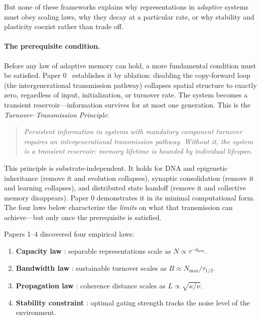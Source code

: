 \documentclass[11pt]{article}
\begin{document}
But none of these frameworks explains why representations in \emph{adaptive} systems must obey scaling laws, why they decay at a particular rate, or why stability and plasticity coexist rather than trade off.

\paragraph{The prerequisite condition.}
Before any law of adaptive memory can hold, a more fundamental condition must be satisfied. Paper 0~\cite{aubin2026p0} establishes it by ablation: disabling the copy-forward loop (the intergenerational transmission pathway) collapses spatial structure to exactly zero, regardless of input, initialization, or turnover rate. The system becomes a transient reservoir---information survives for at most one generation. This is the \emph{Turnover--Transmission Principle}:

\begin{quote}
\textit{Persistent information in systems with mandatory component turnover requires an intergenerational transmission pathway. Without it, the system is a transient reservoir: memory lifetime is bounded by individual lifespan.}
\end{quote}

This principle is substrate-independent. It holds for DNA and epigenetic inheritance (remove it and evolution collapses), synaptic consolidation (remove it and learning collapses), and distributed state handoff (remove it and collective memory disappears). Paper 0 demonstrates it in its minimal computational form. The four laws below characterize the \emph{limits} on what that transmission can achieve---but only once the prerequisite is satisfied.

Papers 1--4 \cite{aubin2026capacity,aubin2026bandwidth,aubin2026propagation,aubin2026stability} discovered four empirical laws:
\begin{enumerate}
\item \textbf{Capacity law} \cite{aubin2026capacity}: separable representations scale as $N \propto \tau^{-d_{\text{seen}}}$.
\item \textbf{Bandwidth law} \cite{aubin2026bandwidth}: sustainable turnover scales as $B \approx N_{\max} / \tau_{1/2}$.
\item \textbf{Propagation law} \cite{aubin2026propagation}: coherence distance scales as $L \propto \sqrt{\kappa / \nu}$.
\item \textbf{Stability constraint} \cite{aubin2026stability}: optimal gating strength tracks the noise level of the environment.
\end{enumerate}
\end{document}
